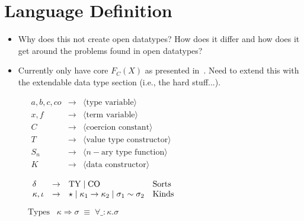 \section{Language Definition}
\label{sec:langdef}

\begin{itemize}
  \item Why does this not create open datatypes? How does it differ and how
  does it get around the problems found in open datatypes?
 \item Currently only have core $F_C(X)$ as presented in~\cite{systemFC}.
 Need to extend this with the extendable data type section (i.e., the hard
 stuff...).
\end{itemize}

{\begin{figure}[H]
\begin{minipage}[t]{0.5\linewidth}
\vspace{5mm}
\vspace{2mm}

$
\begin{array}{lcl}
  a,b,c,co & \to & \langle \textrm{type variable} \rangle \\
  x,f & \to & \langle \textrm{term variable} \rangle \\
  C & \to & \langle \textrm{coercion constant} \rangle \\
  T & \to & \langle \textrm{value type constructor} \rangle \\
  S_n & \to & \langle n-\textrm{ary type function} \rangle \\
  K & \to & \langle \textrm{data constructor} \rangle
\end{array}
$

\vspace{5mm}
\vspace{2mm}

$
\begin{array}{lcll}
  \delta & \to & \textrm{TY} \;|\; \textrm{CO} & \textrm{Sorts} \\
  \kappa, \iota & \to & 
    \star \;|\; \kappa_1 \to \kappa_2 \;|\; \sigma_1 \sim \sigma_2 & \textrm{Kinds}
\end{array}
$

\vspace{5mm}
\vspace{2mm}

$
\textrm{Types} \;\;\; \kappa \Rightarrow \sigma \; \equiv \; \forall \_ :\kappa. \sigma
$


\end{minipage}
\end{figure}}
